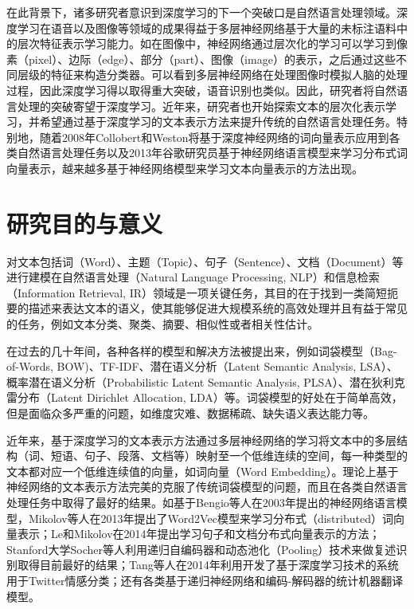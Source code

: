 \documentclass[master]{njuthesis}
\begin{document}
在此背景下，诸多研究者意识到深度学习的下一个突破口是自然语言处理领域。深度学习在语音以及图像等领域的成果得益于多层神经网络基于大量的未标注语料中的层次特征表示学习能力。如在图像中，神经网络通过层次化的学习可以学习到像素（pixel）、边际（edge）、部分（part）、图像（image）的表示，之后通过这些不同层级的特征来构造分类器\cite{lee2009convolutional}。可以看到多层神经网络在处理图像时模拟人脑的处理过程，因此深度学习得以取得重大突破，语音识别也类似\cite{lee2009unsupervised}。因此，研究者将自然语言处理的突破寄望于深度学习。近年来，研究者也开始探索文本的层次化表示学习，并希望通过基于深度学习的文本表示方法来提升传统的自然语言处理任务。特别地，随着2008年Collobert和Weston将基于深度神经网络的词向量表示应用到各类自然语言处理任务\cite{collobert2008unified}以及2013年谷歌研究员基于神经网络语言模型来学习分布式词向量表示\cite{mikolov2013efficient}，越来越多基于神经网络模型来学习文本向量表示的方法出现。

\section{研究目的与意义}\label{sec_chap1_motivations}

对文本包括词（Word）、主题（Topic）、句子（Sentence）、文档（Document）等进行建模在自然语言处理（Natural Language Processing, NLP）和信息检索（Information Retrieval, IR）领域是一项关键任务，其目的在于找到一类简短扼要的描述来表达文本的语义，使其能够促进大规模系统的高效处理并且有益于常见的任务，例如文本分类、聚类、摘要、相似性或者相关性估计。

在过去的几十年间，各种各样的模型和解决方法被提出来，例如词袋模型（Bag-of-Words, BOW)\cite{zhang2010understanding}、TF-IDF\cite{salton1986introduction}、潜在语义分析（Latent Semantic Analysis, LSA）\cite{landauer1998introduction}、概率潜在语义分析（Probabilistic Latent Semantic Analysis, PLSA）\cite{hofmann1999probabilistic}、潜在狄利克雷分布（Latent Dirichlet Allocation, LDA）\cite{blei2003latent}等。词袋模型的好处在于简单高效，但是面临众多严重的问题，如维度灾难、数据稀疏、缺失语义表达能力等。

近年来，基于深度学习的文本表示方法通过多层神经网络的学习将文本中的多层结构（词、短语、句子、段落、文档等）映射至一个低维连续的空间，每一种类型的文本都对应一个低维连续值的向量，如词向量（Word Embedding）。理论上基于神经网络的文本表示方法完美的克服了传统词袋模型的问题，而且在各类自然语言处理任务中取得了最好的结果\cite{collobert2008unified}。如基于Bengio等人在2003年提出的神经网络语言模型\cite{bengio2003neural}，Mikolov等人在2013年提出了Word2Vec模型来学习分布式（distributed）词向量表示\cite{mikolov2013efficient,mikolov2013distributed,mikolov2013linguistic}；Le和Mikolov在2014年提出学习句子和文档分布式向量表示的方法\cite{le2014distributed}；Stanford大学Socher等人利用递归自编码器和动态池化（Pooling）技术来做复述识别取得目前最好的结果\cite{socher2011dynamic}；Tang等人在2014年利用开发了基于深度学习技术的系统用于Twitter情感分类\cite{tang2014coooolll}；还有各类基于递归神经网络和编码-解码器的统计机器翻译模型\cite{bahdanau2014neural,cho2014learning}。
\end{document}
